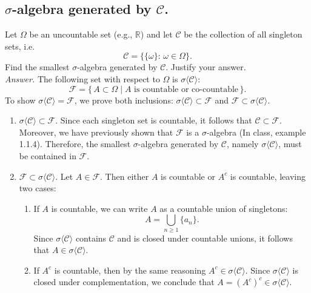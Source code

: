 \documentclass[11pt]{article}
\theoremstyle{definition}
\begin{document}
\subsection{$\sigma$-algebra generated by $\mathcal{C}$.}
\label{subsec:measures:sigma-algebra-generated-c}
Let $\Omega$ be an uncountable set (e.g., $\mathbb{R}$) and let $\mathcal{C}$ be the collection of all singleton sets, i.e.
\[
\mathcal{C}=\bigl\{\{\omega\}:\,\omega\in\Omega\bigr\}.
\]
Find the smallest $\sigma$-algebra generated by $\mathcal{C}$. Justify your answer.
\\
\emph{Answer.}
The following set with respect to $\Omega$ is $\sigma\langle \mathcal{C}\rangle$:
\[
\mathcal{F} = \{\,A \subset \Omega \mid A \text{ is countable or co-countable}\,\}.
\]
To show $\sigma\langle \mathcal{C}\rangle = \mathcal{F}$, we prove both inclusions: 
$\sigma\langle \mathcal{C}\rangle \subset \mathcal{F}$ and $\mathcal{F} \subset \sigma\langle \mathcal{C}\rangle$.

\begin{enumerate}
    \item $\sigma\langle \mathcal{C}\rangle \subset \mathcal{F}$.  
    Since each singleton set is countable, it follows that $\mathcal{C} \subset \mathcal{F}$. 
    Moreover, we have previously shown that $\mathcal{F}$ is a $\sigma$-algebra (In class, example 1.1.4). 
    Therefore, the smallest $\sigma$-algebra generated by $\mathcal{C}$, namely $\sigma\langle \mathcal{C}\rangle$, must be contained in $\mathcal{F}$. 

    \item $\mathcal{F} \subset \sigma\langle \mathcal{C}\rangle$.  
    Let $A \in \mathcal{F}$. Then either $A$ is countable or $A^c$ is countable, leaving two cases:
    \begin{enumerate}
        \item If $A$ is countable, we can write $A$ as a countable union of singletons: 
        \[
        A = \bigcup_{n \geq 1} \{a_n\}.
        \]
        Since $\sigma\langle \mathcal{C}\rangle$ contains $\mathcal{C}$ and is closed under countable unions, it follows that $A \in \sigma\langle \mathcal{C}\rangle$.
        
        \item If $A^c$ is countable, then by the same reasoning $A^c \in \sigma\langle \mathcal{C}\rangle$. 
        Since $\sigma\langle \mathcal{C}\rangle$ is closed under complementation, we conclude that $A = (A^c)^c \in \sigma\langle \mathcal{C}\rangle$. 
    \end{enumerate}
\end{enumerate}
\end{document}
